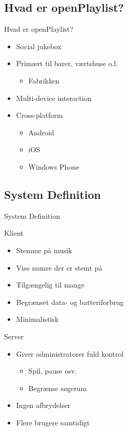 \subsection{Hvad er openPlaylist?}
\begin{frame}{Hvad er openPlaylist?}
	\begin{itemize}
		\item Social jukebox
		\item Primært til barer, værtshuse o.l.
		\begin{itemize}
			\item Fabrikken
		\end{itemize}
		\item Multi-device interaction
		\item Cross-platform
		\begin{itemize}
			\item Android
			\item iOS
			\item Windows Phone
		\end{itemize}
	\end{itemize}
\end{frame}

\subsection{System Definition}
\begin{frame}{System Definition}
	\begin{multicols}{2}
		Klient
		\begin{itemize}
			\item Stemme på musik
			\item Vise numre der er stemt på
			\item Tilgængelig til mange
			\item Begrænset data- og batteriforbrug
			\item Minimalistisk
		\end{itemize}
		
		\columnbreak
		
		Server
		\begin{itemize}
			\item Giver administratorer fuld kontrol
			\begin{itemize}
				\item Spil, pause osv.
				\item Begrænse søgerum
			\end{itemize}
			\item Ingen afbrydelser
			\item Flere brugere samtidigt
		\end{itemize}
	\end{multicols}
\end{frame}

